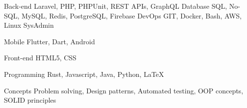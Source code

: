 

\begin{cvskills}

  \cvskill
    {Back-end} %
    {
      Laravel, PHP, PHPUnit, REST APIs, GraphQL
    } %
  \cvskill
    {Database} %
    {
      SQL, No-SQL, MySQL, Redis, PostgreSQL, Firebase
    } %
  \cvskill
    {DevOps} %
    {GIT, Docker, Bash, AWS, Linux SysAdmin} %

  \cvskill
    {Mobile} %
    {Flutter, Dart, Android} %

  \cvskill
    {Front-end} %
    {HTML5, CSS} %

  \cvskill
    {Programming} %
    {Rust, Javascript, Java, Python, LaTeX} %

  \cvskill
    {Concepts} %
    {Problem solving, Design patterns, Automated testing, OOP concepts, SOLID principles} %

\end{cvskills}
